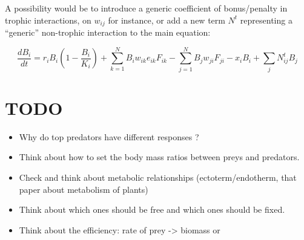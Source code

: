 \documentclass[a4paper,11pt]{article}
\begin{document}
    A possibility would be to introduce a generic coefficient of bonus/penalty 
in trophic interactions, on $w_{ij}$ for instance, or add a new term $N^t$ 
representing a ``generic'' non-trophic interaction to the main equation: 
  
  \begin{equation}
    \label{eq:popdynt}
      \frac{dB_i}{dt} =   r_iB_i(1 - \frac{B_i}{K_i}) 
                        + \sum_{k=1}^{N} B_i w_{ik} e_{ik} F_{ik} 
                        - \sum_{j=1}^{N} B_j w_{ji} F_{ji} 
                        - x_i B_i 
                        + \sum_{j} N^t_{ij} B_j
  \end{equation}
    
  \newpage
  
  \section*{TODO}
    \begin{itemize}
      \item Why do top predators have different responses ? 
      \item Think about how to set the body mass ratios between preys and 
            predators.
      \item Check and think about metabolic relationships (ectoterm/endotherm, 
            that paper about metabolism of plants)
      \item Think about which ones should be free and which ones should be 
            fixed.
      \item Think about the efficiency: rate of prey -> biomass or 
    \end{itemize}
  
  
  \newpage
  \begin{footnotesize}
    \printbibliography
  \end{footnotesize}
  
\end{document}
